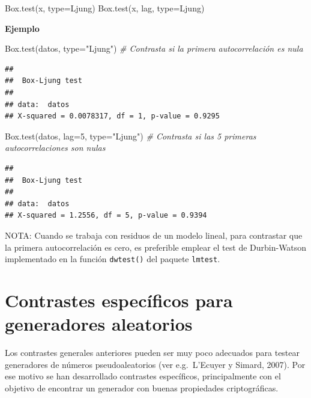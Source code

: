 \documentclass[
]{book}
\newenvironment{Shaded}{\begin{snugshade}}{\end{snugshade}}
\newcommand{\AttributeTok}[1]{\textcolor[rgb]{0.77,0.63,0.00}{#1}}
\newcommand{\CommentTok}[1]{\textcolor[rgb]{0.56,0.35,0.01}{\textit{#1}}}
\newcommand{\DecValTok}[1]{\textcolor[rgb]{0.00,0.00,0.81}{#1}}
\newcommand{\FunctionTok}[1]{\textcolor[rgb]{0.00,0.00,0.00}{#1}}
\newcommand{\NormalTok}[1]{#1}
\newcommand{\StringTok}[1]{\textcolor[rgb]{0.31,0.60,0.02}{#1}}
\theoremstyle{break}
\theoremstyle{nonumberplain}
\begin{document}
\begin{Shaded}
\begin{Highlighting}[]
    \FunctionTok{Box.test}\NormalTok{(x, }\AttributeTok{type=}\NormalTok{Ljung)}
    \FunctionTok{Box.test}\NormalTok{(x, lag, }\AttributeTok{type=}\NormalTok{Ljung)}
\end{Highlighting}
\end{Shaded}

\textbf{Ejemplo}

\begin{Shaded}
\begin{Highlighting}[]
\FunctionTok{Box.test}\NormalTok{(datos, }\AttributeTok{type=}\StringTok{"Ljung"}\NormalTok{) }\CommentTok{\# Contrasta si la primera autocorrelación es nula }
\end{Highlighting}
\end{Shaded}

\begin{verbatim}
## 
##  Box-Ljung test
## 
## data:  datos
## X-squared = 0.0078317, df = 1, p-value = 0.9295
\end{verbatim}

\begin{Shaded}
\begin{Highlighting}[]
\FunctionTok{Box.test}\NormalTok{(datos, }\AttributeTok{lag=}\DecValTok{5}\NormalTok{, }\AttributeTok{type=}\StringTok{"Ljung"}\NormalTok{) }\CommentTok{\# Contrasta si las 5 primeras autocorrelaciones son nulas}
\end{Highlighting}
\end{Shaded}

\begin{verbatim}
## 
##  Box-Ljung test
## 
## data:  datos
## X-squared = 1.2556, df = 5, p-value = 0.9394
\end{verbatim}

NOTA: Cuando se trabaja con residuos de un modelo lineal, para contrastar que la primera autocorrelación es cero, es preferible emplear el test de
Durbin-Watson implementado en la función \texttt{dwtest()} del paquete \texttt{lmtest}.

\hypertarget{contrastes-especuxedficos-para-generadores-aleatorios}{%
\section{Contrastes específicos para generadores aleatorios}\label{contrastes-especuxedficos-para-generadores-aleatorios}}

Los contrastes generales anteriores pueden ser muy poco adecuados para testear generadores de números pseudoaleatorios (ver e.g.~L'Ecuyer y Simard, 2007). Por ese motivo se han desarrollado contrastes específicos, principalmente con el objetivo de encontrar un generador con buenas propiedades criptográficas.
\end{document}
